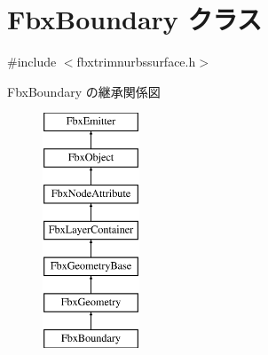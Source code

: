 \hypertarget{class_fbx_boundary}{}\section{Fbx\+Boundary クラス}
\label{class_fbx_boundary}


{\ttfamily \#include $<$fbxtrimnurbssurface.\+h$>$}

Fbx\+Boundary の継承関係図\begin{figure}[H]
\begin{center}
\leavevmode
\includegraphics[height=7.000000cm]{class_fbx_boundary}
\end{center}
\end{figure}
